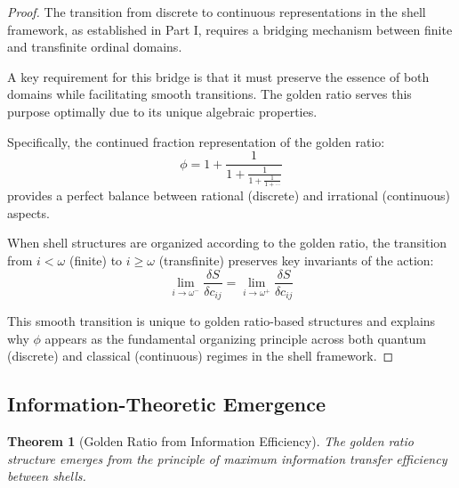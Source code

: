\documentclass[12pt,a4paper]{article}
\newtheorem{theorem}{Theorem}[section]
\begin{document}
    \begin{proof}
    The transition from discrete to continuous representations in the shell framework, as established in Part I, requires a bridging mechanism between finite and transfinite ordinal domains.
    
    A key requirement for this bridge is that it must preserve the essence of both domains while facilitating smooth transitions. The golden ratio serves this purpose optimally due to its unique algebraic properties.
    
    Specifically, the continued fraction representation of the golden ratio:
    \begin{equation}
    \phi = 1 + \frac{1}{1 + \frac{1}{1 + \frac{1}{1 + \cdots}}}
    \end{equation}
    provides a perfect balance between rational (discrete) and irrational (continuous) aspects.
    
    When shell structures are organized according to the golden ratio, the transition from $i < \omega$ (finite) to $i \geq \omega$ (transfinite) preserves key invariants of the action:
    \begin{equation}
    \lim_{i \to \omega^-} \frac{\delta S}{\delta c_{ij}} = \lim_{i \to \omega^+} \frac{\delta S}{\delta c_{ij}}
    \end{equation}
    
    This smooth transition is unique to golden ratio-based structures and explains why $\phi$ appears as the fundamental organizing principle across both quantum (discrete) and classical (continuous) regimes in the shell framework.
    \end{proof}
    
    \subsection{Information-Theoretic Emergence}
    \label{subsec:information-theory}
    
    \begin{theorem}[Golden Ratio from Information Efficiency]
    \label{thm:information-efficiency}
    The golden ratio structure emerges from the principle of maximum information transfer efficiency between shells.
    \end{theorem}
    
\end{document}
